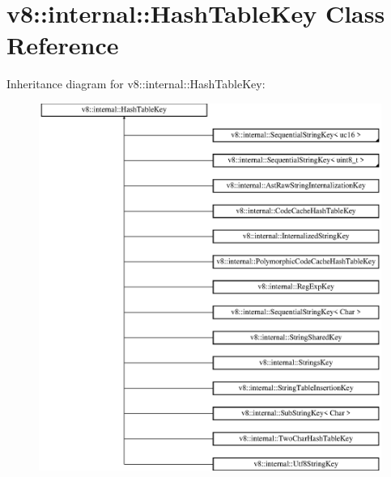 \hypertarget{classv8_1_1internal_1_1_hash_table_key}{}\section{v8\+:\+:internal\+:\+:Hash\+Table\+Key Class Reference}
\label{classv8_1_1internal_1_1_hash_table_key}
Inheritance diagram for v8\+:\+:internal\+:\+:Hash\+Table\+Key\+:\begin{figure}[H]
\begin{center}
\leavevmode
\includegraphics[height=12.000000cm]{classv8_1_1internal_1_1_hash_table_key}
\end{center}
\end{figure}
